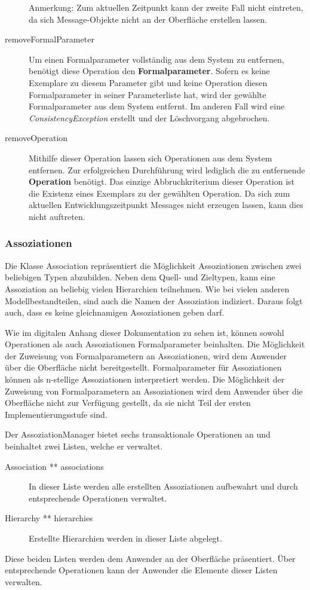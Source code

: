 \begin{description}
Anmerkung: Zum aktuellen Zeitpunkt kann der zweite Fall nicht eintreten, da sich Message-Objekte nicht an der Oberfläche erstellen lassen.
\item[removeFormalParameter]
Um einen Formalparameter vollständig aus dem System zu entfernen, benötigt diese Operation den \textbf{Formalparameter}. Sofern es keine Exemplare zu diesem Parameter gibt und keine Operation diesen Formalparameter in seiner Parameterliste hat, wird der gewählte Formalparameter aus dem System entfernt. Im anderen Fall wird eine \emph{ConsistencyException} erstellt und der Löschvorgang abgebrochen.
\item[removeOperation]
Mithilfe dieser Operation lassen sich Operationen aus dem System entfernen. Zur erfolgreichen Durchführung wird lediglich die zu entfernende \textbf{Operation} benötigt. Das einzige Abbruchkriterium dieser Operation ist die Existenz eines Exemplars zu der gewählten Operation. Da sich zum aktuellen Entwicklungszeitpunkt Messages nicht erzeugen lassen, kann dies nicht auftreten.

\end{description}

\newpage
\subsubsection{Assoziationen}\label{Operation:Associationen}

Die Klasse Association repräsentiert die Möglichkeit Assoziationen zwischen zwei beliebigen Typen abzubilden.
Neben dem Quell- und Zieltypen, kann eine Assoziation an beliebig vielen Hierarchien teilnehmen.
Wie bei vielen anderen Modellbestandteilen, sind auch die Namen der Assoziation indiziert. Daraus folgt auch, dass es keine gleichnamigen 
Assoziationen geben darf.

Wie im digitalen Anhang dieser Dokumentation zu sehen ist, können sowohl Operationen als auch Assoziationen Formalparameter beinhalten. Die Möglichkeit der Zuweisung von
Formalparametern an Assoziationen, wird dem Anwender über die Oberfläche nicht bereitgestellt. 
Formalparameter für Assoziationen können als n-stellige Assoziationen interpretiert werden.
Die Möglichkeit der Zuweisung von Formalparametern an Assoziationen wird dem Anwender über die Oberfläche nicht zur Verfügung gestellt, da sie nicht Teil der ersten Implementierungsstufe sind.


Der AssoziationManager bietet sechs transaktionale Operationen an und beinhaltet zwei Listen, welche er verwaltet.
\begin{description}
\item[Association ** associations] In dieser Liste werden alle erstellten Assoziationen aufbewahrt und durch entsprechende Operationen verwaltet.
\item[Hierarchy ** hierarchies] Erstellte Hierarchien werden in dieser Liste abgelegt.
\end{description}
Diese beiden Listen werden dem Anwender an der 
Oberfläche präsentiert. Über entsprechende Operationen kann der Anwender die Elemente dieser Listen verwalten.

